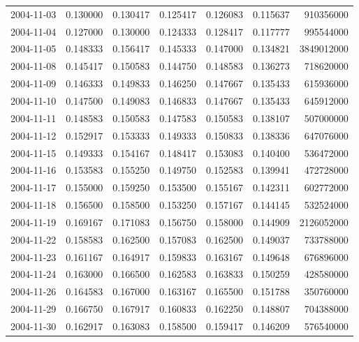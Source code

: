 \begin{tabular}{lrrrrrr}
2004-11-03 &    0.130000 &    0.130417 &    0.125417 &    0.126083 &    0.115637 &   910356000 \\
2004-11-04 &    0.127000 &    0.130000 &    0.124333 &    0.128417 &    0.117777 &   995544000 \\
2004-11-05 &    0.148333 &    0.156417 &    0.145333 &    0.147000 &    0.134821 &  3849012000 \\
2004-11-08 &    0.145417 &    0.150583 &    0.144750 &    0.148583 &    0.136273 &   718620000 \\
2004-11-09 &    0.146333 &    0.149833 &    0.146250 &    0.147667 &    0.135433 &   615936000 \\
2004-11-10 &    0.147500 &    0.149083 &    0.146833 &    0.147667 &    0.135433 &   645912000 \\
2004-11-11 &    0.148583 &    0.150583 &    0.147583 &    0.150583 &    0.138107 &   507000000 \\
2004-11-12 &    0.152917 &    0.153333 &    0.149333 &    0.150833 &    0.138336 &   647076000 \\
2004-11-15 &    0.149333 &    0.154167 &    0.148417 &    0.153083 &    0.140400 &   536472000 \\
2004-11-16 &    0.153583 &    0.155250 &    0.149750 &    0.152583 &    0.139941 &   472728000 \\
2004-11-17 &    0.155000 &    0.159250 &    0.153500 &    0.155167 &    0.142311 &   602772000 \\
2004-11-18 &    0.156500 &    0.158500 &    0.153250 &    0.157167 &    0.144145 &   532524000 \\
2004-11-19 &    0.169167 &    0.171083 &    0.156750 &    0.158000 &    0.144909 &  2126052000 \\
2004-11-22 &    0.158583 &    0.162500 &    0.157083 &    0.162500 &    0.149037 &   733788000 \\
2004-11-23 &    0.161167 &    0.164917 &    0.159833 &    0.163167 &    0.149648 &   676896000 \\
2004-11-24 &    0.163000 &    0.166500 &    0.162583 &    0.163833 &    0.150259 &   428580000 \\
2004-11-26 &    0.164583 &    0.167000 &    0.163167 &    0.165500 &    0.151788 &   350760000 \\
2004-11-29 &    0.166750 &    0.167917 &    0.160833 &    0.162250 &    0.148807 &   704388000 \\
2004-11-30 &    0.162917 &    0.163083 &    0.158500 &    0.159417 &    0.146209 &   576540000 \\

\end{tabular}
